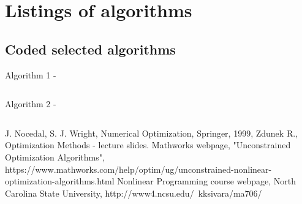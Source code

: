 \documentclass[eng,openany]{mgr}
\begin{document}
\clearpage

\clearpage




\clearpage


\clearpage



\clearpage








\clearpage
\chapter{Listings of algorithms}
\section{Coded selected algorithms}
Algorithm 1 - \\ 
\begin{lstlisting}

\end{lstlisting}
\newpage
Algorithm 2 - \\
\begin{lstlisting}
\end{lstlisting}
\begin{thebibliography}{8}
J. Nocedal, S. J. Wright, Numerical Optimization, Springer, 1999,
Zdunek R., Optimization Methods - lecture slides.
Mathworks webpage, "Unconstrained Optimization Algorithms", https://www.mathworks.com/help/optim/ug/unconstrained-nonlinear-optimization-algorithms.html
Nonlinear Programming course webpage, North Carolina State University,
http://www4.ncsu.edu/~kksivara/ma706/
\end{thebibliography}
\end{document}
